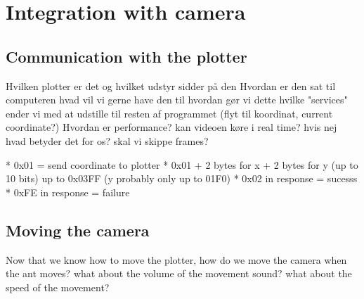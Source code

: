 
\section{Integration with camera}

\subsection{Communication with the plotter}
Hvilken plotter er det og hvilket udstyr sidder på den
Hvordan er den sat til computeren
hvad vil vi gerne have den til
hvordan gør vi dette
hvilke "services" ender vi med at udstille til resten af programmet (flyt til koordinat, current coordinate?)
Hvordan er performance? kan videoen køre i real time? hvis nej hvad betyder det for os? skal vi skippe frames?

*   0x01 = send coordinate to plotter
 *   0x01 + 2 bytes for x + 2 bytes for y (up to 10 bits) up to 0x03FF (y
probably only up to 01F0)
 *   0x02 in response = sucesss
 *   0xFE in response = failure
 
\subsection{Moving the camera}
Now that we know how to move the plotter, how do we move the camera when the ant moves?
what about the volume of the movement sound?
what about the speed of the movement?
